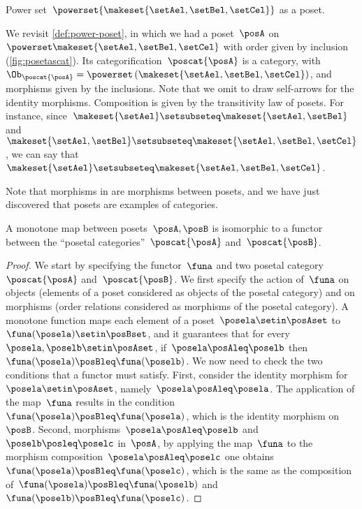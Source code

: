 \begin{marginfigure}
    \centering
    \caption{Power set~$\powerset{\makeset{\setAel,\setBel,\setCel}}$ as a poset. \label{fig:posetascat}}
\end{marginfigure}

\begin{example}
    We revisit \cref{def:power-poset}, in which we had a poset~$\posA$ on $\powerset \makeset{\setAel,\setBel,\setCel}$ with order given by inclusion (\cref{fig:posetascat}).
    Its categorification~$\poscat{\posA}$ is a category, with $\Ob_{\poscat{\posA}}=\powerset\left(\makeset{\setAel,\setBel,\setCel}\right)$, and morphisms given by the inclusions.
    Note that we omit to draw self-arrows for the identity morphisms.
    Composition is given by the transitivity law of posets.
    For instance, since~$\makeset{\setAel}\setsubseteq \makeset{\setAel,\setBel}$ and~$\makeset{\setAel,\setBel} \setsubseteq \makeset{\setAel,\setBel,\setCel}$, we can say that~$\makeset{\setAel}\setsubseteq \makeset{\setAel,\setBel,\setCel}$.
\end{example}



Note that morphisms in \Pos are morphisms between posets, and we have just discovered that posets are examples of categories.
\begin{lemma}
    \label{lem:posetfunctor}
    A monotone map between posets~$\posA,\posB$ is isomorphic to a functor between the ``posetal categories''~$\poscat{\posA}$ and~$\poscat{\posB}$.
\end{lemma}
\begin{proof}
    We start by specifying the functor~$\funa$ and two posetal category~$\poscat{\posA}$ and~$\poscat{\posB}$.
    We first specify the action of~$\funa$ on objects (elements of a poset considered as objects of the posetal category) and on morphisms (order relations considered as morphisms of the posetal category).
    A monotone function maps each element of a poset~$\posela\setin \posAset$ to~$\funa(\posela) \setin \posBset$, and it guarantees that for every~$\posela,\poselb\setin \posAset$, if~$\posela\posAleq \poselb$ then~$\funa(\posela)\posBleq \funa(\poselb)$.
    We now need to check the two conditions that a functor must satisfy.
    First, consider the identity morphism for~$\posela\setin \posAset$, namely~$\posela \posAleq \posela$.
    The application of the map~$\funa$ results in the condition~$\funa(\posela)\posBleq \funa(\posela)$, which is the identity morphism on~$\posB$.
    Second, morphisms~$\posela\posAleq \poselb$ and~$\poselb\posleq \poselc$ in~$\posA$, by applying the map~$\funa$ to the morphism composition~$\posela\posAleq \poselc$ one obtains~$\funa(\posela)\posBleq \funa(\poselc)$, which is the same as the composition of~$\funa(\posela)\posBleq \funa(\poselb)$ and~$\funa(\poselb)\posBleq \funa(\poselc)$.
\end{proof}

